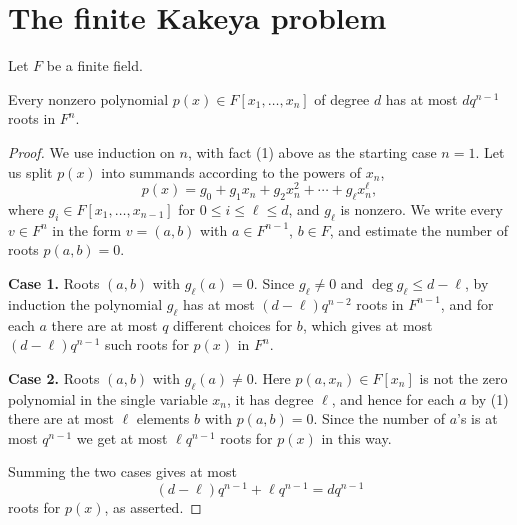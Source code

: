 \chapter{The finite Kakeya problem}

Let $F$ be a finite field.

\begin{lemma}
  \label{ch35lemma1}
  Every nonzero polynomial $p(x) \in F[x_1, \dots, x_n]$ of degree $d$ has at
  most $dq^{n-1}$ roots in $F^n$.
\end{lemma}
\begin{proof}
  We use induction on $n$, with fact (1) above as the starting case $n = 1$. Let us split $p(x)$ into
  summands according to the powers of $x_n$,
\[
p(x) = g_0 + g_1 x_n + g_2 x_n^2 + \cdots + g_\ell x_n^\ell,
\]
where $g_i \in F[x_1, \dots, x_{n-1}]$ for $0 \leq i \leq \ell \leq d$, and $g_\ell$ is nonzero.
We write every $v \in F^n$ in the form $v = (a, b)$ with $a \in F^{n-1}$, $b \in F$, and
estimate the number of roots $p(a, b) = 0$.

\textbf{Case 1.} Roots $(a, b)$ with $g_\ell(a) = 0$.
Since $g_\ell \neq 0$ and $\deg g_\ell \leq d - \ell$, by induction the polynomial $g_\ell$ has at
most $(d - \ell) q^{n-2}$ roots in $F^{n-1}$, and for each $a$ there are at most $q$ different
choices for $b$, which gives at most $(d - \ell)q^{n-1}$ such roots for $p(x)$ in $F^n$.

\textbf{Case 2.} Roots $(a, b)$ with $g_\ell(a) \neq 0$.
Here $p(a, x_n) \in F[x_n]$ is not the zero polynomial in the single variable $x_n$, it has degree
$\ell$, and hence for each $a$ by (1) there are at most $\ell$ elements $b$ with $p(a, b) = 0$. Since the number of $a$'s is at most $q^{n-1}$ we get at most $\ell q^{n-1}$ roots for $p(x)$ in this way.

Summing the two cases gives at most
\[
(d - \ell)q^{n-1} + \ell q^{n-1} = dq^{n-1}
\]
roots for $p(x)$, as asserted.
\end{proof}

